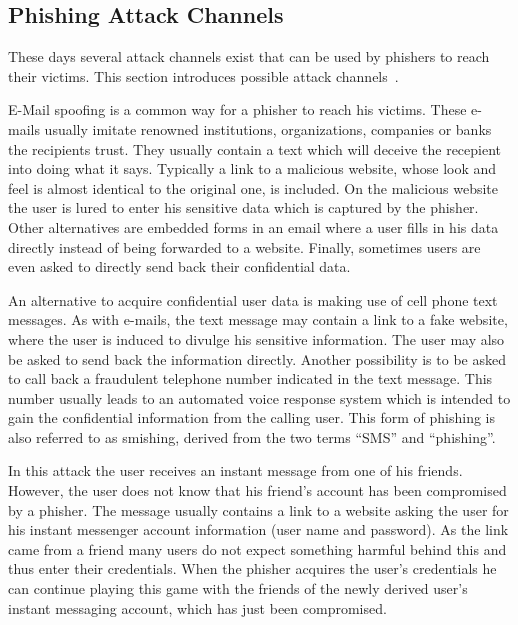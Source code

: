 \subsection{Phishing Attack Channels}
These days several attack channels exist that can be used by phishers to reach their victims.
 This section introduces possible attack channels~\cite{phishing2010ramazan}.
\label{s:attack_channels}
\begin{description}[leftmargin=0cm]
	\item[E-Mail] E-Mail spoofing is a common way for a phisher to reach his victims.
 These e-mails usually imitate renowned institutions, organizations, companies or banks the recipients trust.
 They usually contain a text which will deceive the recepient into doing what it says.
 Typically a link to a malicious website, whose look and feel is almost identical to the original one, is included.
 On the malicious website the user is lured to enter his sensitive data which is captured by the phisher.
 Other alternatives are embedded forms in an email where a user fills in his data directly instead of being forwarded to a website.
 Finally, sometimes users are even asked to directly send back their confidential data.

	\item[SMS] An alternative to acquire confidential user data is making use of cell phone text messages.
 As with e-mails, the text message may contain a link to a fake website, where the user is induced to divulge his sensitive information.
 The user may also be asked to send back the information directly.
 Another possibility is to be asked to call back a fraudulent telephone number indicated in the text message.
 This number usually leads to an automated voice response system which is intended to gain the confidential information from the calling user.
 This form of phishing is also referred to as smishing, derived from the two terms ``SMS'' and ``phishing''.
	\item[Instant Messaging] In this attack the user receives an instant message from one of his friends.
 However, the user does not know that his friend's account has been compromised by a phisher.
 The message usually contains a link to a website asking the user for his instant messenger account information (user name and password). As the link came from a friend many users do not expect something harmful behind this and thus enter their credentials.
 When the phisher acquires the user's credentials he can continue playing this game with the friends of the newly derived user's instant messaging account, which has just been compromised.


\end{description}
